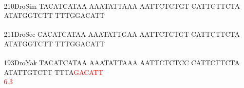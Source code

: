 \documentclass[11pt,twoside,reqno,a4paper]{article}
\begin{document}
{\hspace*{4\charwidth}\hspace*{7\charwidth}\hspace*{1\charwidth}\hspace*{1\charwidth}\hspace*{1\charwidth}\hspace*{1\charwidth}\hspace*{1\charwidth}\hspace*{1\charwidth}\\
210\hspace*{1\charwidth}DroSim	TACATCATAA	AAATATTAAA	AATTCTCTGT	CATTCTTCTA	ATATGGTCTT	TTTGGACATT	\\
\hspace*{4\charwidth}\hspace*{7\charwidth}\hspace*{1\charwidth}\hspace*{1\charwidth}\hspace*{1\charwidth}\hspace*{1\charwidth}\hspace*{1\charwidth}\hspace*{1\charwidth}\\
211\hspace*{1\charwidth}DroSec	CACATCATAA	AAATATTGAA	AATTCTCTGT	CATTCTTCTA	ATATGGTCTT	TTTGGACATT	\\
\hspace*{4\charwidth}\hspace*{7\charwidth}\hspace*{1\charwidth}\hspace*{1\charwidth}\hspace*{1\charwidth}\hspace*{1\charwidth}\hspace*{1\charwidth}\hspace*{1\charwidth}\\
193\hspace*{1\charwidth}DroYak	TACATCATAA	AAATATTAAA	AATTCTCTCC	CATTCTTCTA	ATATTGTCTT	TTTA\textcolor{red}{G}\textcolor{red}{A}\textcolor{red}{C}\textcolor{red}{A}\textcolor{red}{T}\textcolor{red}{T}	\\
\hspace*{4\charwidth}\hspace*{7\charwidth}\hspace*{1\charwidth}\hspace*{1\charwidth}\hspace*{1\charwidth}\hspace*{1\charwidth}\hspace*{1\charwidth}\hspace*{54\charwidth}\textcolor{red}{6.3}\hspace*{1\charwidth}\\
}
\end{document}
